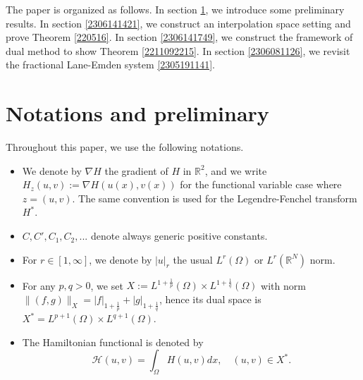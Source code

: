 \documentclass[10pt]{article}
\numberwithin{equation}{section}
\newtheorem{remark}[theorem]{Remark}
\newcommand{\R}{\mathbb R}
\numberwithin{equation}{section}
\begin{document}

The paper is organized as follows. In section \ref{2306052054}, we introduce some preliminary results. In section \ref{2306141421}, we construct an interpolation space setting and prove Theorem \ref{220516}. In section \ref{2306141749}, we construct the framework of dual method to show Theorem \ref{2211092215}. In section \ref{2306081126}, we revisit the fractional Lane-Emden system \eqref{2305191141}.

\section{Notations and preliminary}\label{2306052054}
Throughout this paper, we use the following notations.
\begin{itemize}
\item We denote by $\nabla H$ the gradient of $H$ in $\R^2$, and we write $H_z(u, v) := \nabla H(u(x), v(x))$ for the functional variable case where $z=(u, v)$. The same convention is used for the Legendre-Fenchel transform $H^*$.
\item $C, C', C_1, C_2,...$ denote always generic positive constants.
\item For $r\in [1, \infty]$, we denote by $|u|_r$ the usual $L^r(\Omega)$ or $L^r(\R^N)$ norm.
\item For any $p, q > 0$, we set $X:=L^{1+\frac1p}(\Omega)\times L^{1+\frac1q}(\Omega)$ with norm $\|(f, g)\|_{X}=|f|_{1+\frac1p}+|g|_{1+\frac1q}$, hence its dual space is $X^*=L^{p+1}(\Omega)\times L^{q+1}(\Omega)$.
\item The Hamiltonian functional is denoted by
\[
\mathcal{H}(u, v) =\int_{\Omega}H(u, v) dx,\quad (u, v)\in X^*.
\]
\end{itemize}
\end{document}
